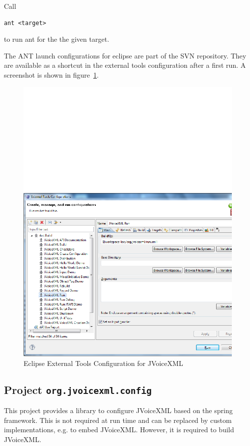 \documentclass[11pt,a4paper]{article}
\begin{document}
Call
\begin{lstlisting}
ant <target>
\end{lstlisting}
to run ant for the the given target.

The ANT launch configurations for eclipse are part of the SVN repository. They
are available as a shortcut in the external tools configuration after a first
run. A screenshot is shown in figure~\ref{fig:eclipse-launch}.
\begin{figure}
\includegraphics[width=\linewidth]{eclipse-launch.png}
\caption{Eclipse External Tools Configuration for JVoiceXML}
\label{fig:eclipse-launch}
\end{figure}


\subsection{Project \texttt{org.jvoicexml.config}}
\label{sec:org.jvoicexml.config}

This project provides a library to configure JVoiceXML based on the spring
framework.
This is not required at run time and can be replaced by custom
implementations, e.g. to embed JVoiceXML. However, it is required to build
JVoiceXML.
\end{document}
